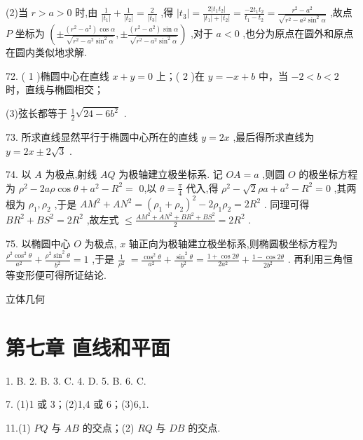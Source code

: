 \documentclass[10pt]{article}
\begin{document}
(2)当 \(r > a > 0\) 时,由 \(\frac{1}{\left| {t}_{1}\right| } + \frac{1}{\left| {t}_{2}\right| } = \frac{2}{\left| {t}_{3}\right| }\) ,得 \(\left| {t}_{3}\right|  = \frac{2\left| {{t}_{1}{t}_{2}}\right| }{\left| {t}_{1}\right|  + \left| {t}_{2}\right| } = \frac{-2{t}_{1}{t}_{2}}{{t}_{1} - {t}_{2}} = \frac{{r}^{2} - {a}^{2}}{\sqrt{{r}^{2} - {a}^{2}{\sin }^{2}\alpha }}\) ,故点 \(P\) 坐标为 \(\left( {\pm \frac{\left( {{r}^{2} - {a}^{2}}\right) \cos \alpha }{\sqrt{{r}^{2} - {a}^{2}{\sin }^{2}\alpha }}, \pm  \frac{\left( {{r}^{2} - {a}^{2}}\right) \sin \alpha }{\sqrt{{r}^{2} - {a}^{2}{\sin }^{2}\alpha }}}\right)\) ,对于 \(a < 0\) ,也分为原点在圆外和原点在圆内类似地求解.

72. ( 1 )椭圆中心在直线 \(x + y = 0\) 上；( 2 )在 \(y =  - x + b\) 中，当 \(- 2 < b < 2\) 时，直线与椭圆相交；

(3)弦长都等于 \(\frac{1}{2}\sqrt{{24} - 6{b}^{2}}\) .

73. 所求直线显然平行于椭圆中心所在的直线 \(y = {2x}\) ,最后得所求直线为 \(y = {2x} \pm  2\sqrt{3}\) .

74. 以 \(A\) 为极点,射线 \({AQ}\) 为极轴建立极坐标系. 记 \({OA} = a\) ,则圆 \(O\) 的极坐标方程为 \({\rho }^{2} - {2a\rho }\cos \theta  + {a}^{2} - {R}^{2} =\) 0,以 \(\theta  = \frac{\pi }{4}\) 代入,得 \({\rho }^{2} - \sqrt{2}{\rho a} + {a}^{2} - {R}^{2} = 0\) ,其两根为 \({\rho }_{1},{\rho }_{2}\) ,于是 \(A{M}^{2} + A{N}^{2} = {\left( {\rho }_{1} + {\rho }_{2}\right) }^{2} - 2{\rho }_{1}{\rho }_{2} = 2{R}^{2}\) . 同理可得 \(B{R}^{2} + B{S}^{2} = 2{R}^{2}\) ,故左式 \(\leq  \frac{A{M}^{2} + A{N}^{2} + B{R}^{2} + B{S}^{2}}{2} = 2{R}^{2}\) .

75. 以椭圆中心 \(O\) 为极点, \(x\) 轴正向为极轴建立极坐标系,则椭圆极坐标方程为 \(\frac{{\rho }^{2}{\cos }^{2}\theta }{{a}^{2}} + \frac{{\rho }^{2}{\sin }^{2}\theta }{{b}^{2}} = 1\) ,于是 \(\frac{1}{{\rho }^{2}} \; = \frac{{\cos }^{2}\theta }{{a}^{2}} + \frac{{\sin }^{2}\theta }{{b}^{2}} = \frac{1 + \cos {2\theta }}{2{a}^{2}} + \frac{1 - \cos {2\theta }}{2{b}^{2}}\) . 再利用三角恒等变形便可得所证结论.

立体几何

\section*{第七章 直线和平面}

1. B. 2. B. 3. C. 4. D. 5. B. 6. C.

7. (1)1 或 3；(2)1,4 或 6；(3)6,1.

11.(1) \({PQ}\) 与 \({AB}\) 的交点；(2) \({RQ}\) 与 \({DB}\) 的交点.
\end{document}
